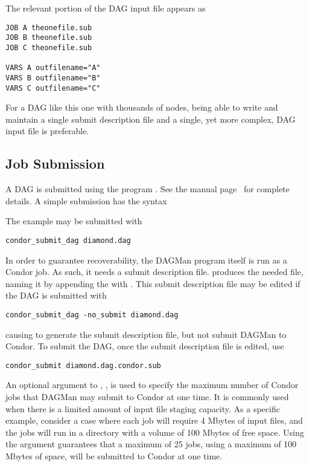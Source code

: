 The relevant portion of the DAG input file appears as 
\begin{verbatim}
JOB A theonefile.sub
JOB B theonefile.sub
JOB C theonefile.sub

VARS A outfilename="A"
VARS B outfilename="B"
VARS C outfilename="C"
\end{verbatim}

For a DAG like this one with thousands of nodes,
being able to write and maintain a single submit description file 
and a single, yet more complex, DAG input file is preferable.

\subsection{\label{dagman:submitdag}Job Submission}

A DAG is submitted using the program .
See the manual
page~\pageref{man-condor-submit}
for complete details.
A simple submission has the syntax

 

The example may be submitted with

\begin{verbatim}
condor_submit_dag diamond.dag
\end{verbatim}
In order to guarantee recoverability, the DAGMan program itself
is run as a Condor job.
As such, it needs a submit description file.
 produces the needed file,
naming it by appending the  with
.
This submit description file may be edited if the DAG is
submitted with

\begin{verbatim}
condor_submit_dag -no_submit diamond.dag
\end{verbatim}
causing  to generate the submit description file,
but not submit DAGMan to Condor.
To submit the DAG, once the submit description file is edited,
use

\begin{verbatim}
condor_submit diamond.dag.condor.sub
\end{verbatim}

An optional argument to , , 
is used to specify the maximum number of Condor jobs that DAGMan may
submit to Condor at one time.
It is commonly used when 
there is a limited amount of input file staging capacity.
As a specific example, consider a case where each job will
require 4 Mbytes of input files,
and the jobs will run in a directory with a volume of 100 Mbytes
of free space.
Using the argument  guarantees that a maximum
of 25 jobs, using a maximum of 100 Mbytes of space,
will be submitted to Condor at one time.

